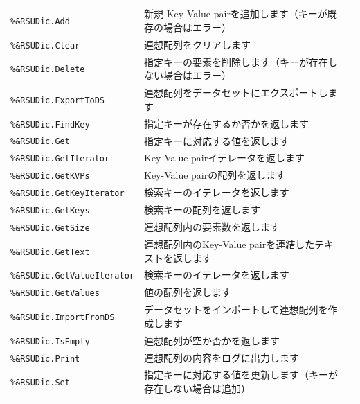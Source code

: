 \paragraph{\DocStrTitleRDMPackageFunctionList}
\begin{center}
{\footnotesize
\begin{xltabular}{\textwidth}{|p{4truecm}|X|p{1.2truecm}|}
\hline
\thead{\DocStrHeaderFunctionName}&\thead{\DocStrDescription}&\thead{\DocStrRefto}\\
\hline
\hline
\texttt{\%\&RSUDic.Add}&新規 Key-Value pairを追加します（キーが既存の場合はエラー）&\\
\hline
\texttt{\%\&RSUDic.Clear}&連想配列をクリアします&\\
\hline
\texttt{\%\&RSUDic.Delete}&指定キーの要素を削除します（キーが存在しない場合はエラー）&\\
\hline
\texttt{\%\&RSUDic.ExportToDS}&連想配列をデータセットにエクスポートします&\\
\hline
\texttt{\%\&RSUDic.FindKey}&指定キーが存在するか否かを返します&\\
\hline
\texttt{\%\&RSUDic.Get}&指定キーに対応する値を返します&\\
\hline
\texttt{\%\&RSUDic.GetIterator}&Key-Value pairイテレータを返します&\\
\hline
\texttt{\%\&RSUDic.GetKVPs}&Key-Value pairの配列を返します&\\
\hline
\texttt{\%\&RSUDic.GetKeyIterator}&検索キーのイテレータを返します&\\
\hline
\texttt{\%\&RSUDic.GetKeys}&検索キーの配列を返します&\\
\hline
\texttt{\%\&RSUDic.GetSize}&連想配列内の要素数を返します&\\
\hline
\texttt{\%\&RSUDic.GetText}&連想配列内のKey-Value pairを連結したテキストを返します&\\
\hline
\texttt{\%\&RSUDic.GetValueIterator}&検索キーのイテレータを返します&\\
\hline
\texttt{\%\&RSUDic.GetValues}&値の配列を返します&\\
\hline
\texttt{\%\&RSUDic.ImportFromDS}&データセットをインポートして連想配列を作成します&\\
\hline
\texttt{\%\&RSUDic.IsEmpty}&連想配列が空か否かを返します&\\
\hline
\texttt{\%\&RSUDic.Print}&連想配列の内容をログに出力します&\\
\hline
\texttt{\%\&RSUDic.Set}&指定キーに対応する値を更新します（キーが存在しない場合は追加）&\\
\hline
\end{xltabular}
}
\end{center}
